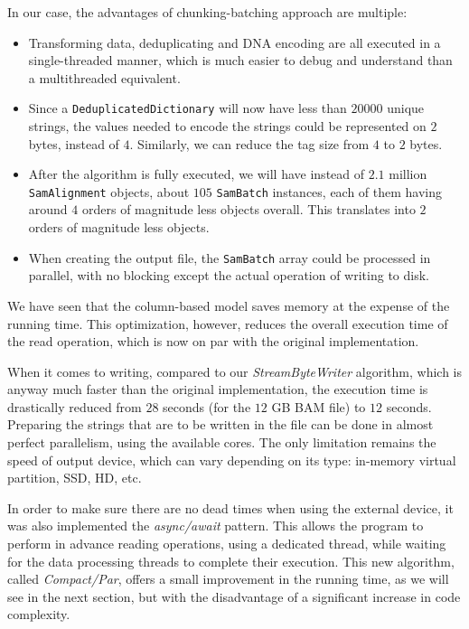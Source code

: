 \documentclass[a4paper,twoside]{article}
\begin{document}
In our case, the advantages of chunking-batching approach are multiple:
\begin{itemize}
\item Transforming data, deduplicating and DNA encoding are all executed in a single-threaded manner, which is much easier to debug and understand than a multithreaded equivalent.

\item Since a {\texttt{DeduplicatedDictionary}} will now have less than $20000$ unique strings, the values needed to encode the strings could be represented on $2$ bytes, instead of $4$.
Similarly, we can reduce the tag size from $4$ to $2$ bytes.

\item After the algorithm is fully executed,  we will have instead of $2.1$ million {\texttt{SamAlignment}} objects, about $105$ {\texttt{SamBatch}} instances, each of them having around $4$ orders of magnitude less objects overall.
This translates into $2$ orders of magnitude less objects.

\item When creating the output file, the {\texttt{SamBatch}} array could be processed in parallel, with no blocking except the actual operation of writing to disk.
\end{itemize}

We have seen that the column-based model saves memory at the expense of the running time.
This optimization, however, reduces the overall execution time of the read operation, which is now on par with the original implementation.

When it comes to writing, compared to our {\textit{StreamByteWriter} } algorithm, which is anyway much faster than the original implementation, the execution time is drastically reduced from $28$ seconds (for the $12$ GB BAM file) to $12$ seconds.
Preparing the strings that are to be written in the file can be done in almost perfect parallelism, using the available cores.
The only limitation remains the speed of output device, which can vary depending on its type: in-memory virtual partition, SSD, HD, etc.

In order to make sure there are no dead times when using the external device, it was also implemented the {\textit{async/await}} pattern. This allows the program to perform in advance reading operations, using a dedicated thread, while waiting for the data processing threads to complete their execution.
This new algorithm, called {\textit{Compact/Par}}, offers a small improvement in the running time, as we will see in the next section, but with the disadvantage of a significant increase in code complexity.
\end{document}
